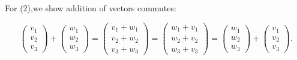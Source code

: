 \begin{example}{}
For (2),we show addition of vectors commutes:

\[ \left(\begin{array}{c}v_1\\v_2\\v_3\end{array}\right) + \left(\begin{array}{c}w_1\\w_2\\w_3\end{array}\right) = \left(\begin{array}{c}v_1+w_1\\v_2+w_2\\v_3+w_3\end{array}\right) 
 =  \left(\begin{array}{c}w_1+v_1\\w_2+v_2\\w_3+v_3\end{array}\right) = \left(\begin{array}{c}w_1\\w_2\\w_3\end{array}\right) +\left(\begin{array}{c}v_1\\v_2\\v_3\end{array}\right).\]


\end{example}

